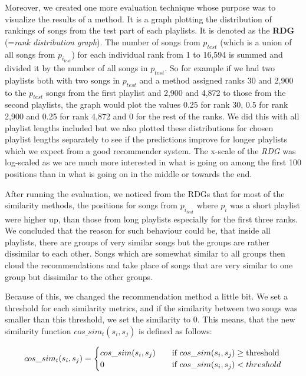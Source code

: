Moreover, we created one more evaluation technique whose purpose was to visualize the results of a method. It is a graph plotting the distribution of rankings of songs from the test part of each playlists. It is denoted as the \textbf{RDG} (=\textit{rank distribution graph}). The number of songs from $p_{test}$ (which is a union of all songs from $p_{i_{test}}$) for each individual rank from 1 to 16,594 is summed and divided it by the number of all songs in $p_{test}$. So for example if we had two playlists both with two songs in $p_{test}$ and a method assigned ranks 30 and 2,900 to the $p_{test}$ songs from the first playlist and 2,900 and 4,872 to those from the second playlists, the graph would plot the values 0.25 for rank 30, 0.5 for rank 2,900 and 0.25 for rank 4,872 and 0 for the rest of the ranks. We did this with all playlist lengths included but we also plotted these distributions for chosen playlist lengths separately to see if the predictions improve for longer playlists which we expect from a good recommender system. The x-scale of the \textit{RDG} was log-scaled as we are much more interested in what is going on among the first 100 positions than in what is going on in the middle or towards the end. 
    
After running the evaluation, we noticed from the RDGs that for most of the similarity methods, the positions for songs from $p_{i_{test}} $ where $p_i$ was a short playlist were higher up, than those from long playlists especially for the first three ranks. We concluded that the reason for such behaviour could be, that inside all playlists, there are groups of very similar songs but the groups are rather dissimilar to each other. Songs which are somewhat similar to all groups then cloud the recommendations and take place of songs that are very similar to one group but dissimilar to the other groups.

Because of this, we changed the recommendation method a little bit. We set a threshold for each similarity metrics, and if the similarity between two songs was smaller than this threshold, we set the similarity to 0. This means, that the new similarity function $cos\_sim_t(s_i,s_j)$ is defined as follows:

\[   
cos\_sim_t(s_i,s_j) = 
     \begin{cases}
       \text{$ cos\_sim(s_i,s_j) $} &\quad\text{if $ cos\_sim(s_i,s_j)$} \geq \text{threshold}\\
       \text{$ 0 $} &\quad\text{if $ cos\_sim(s_i,s_j)  < threshold$}\\
     \end{cases}
\]

